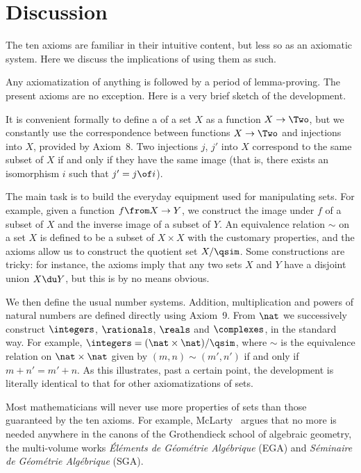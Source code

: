 \documentclass[12pt]{article}
\begin{document}
\section{Discussion} 
\label{sec:rmks}


The ten axioms are familiar in their intuitive content, but less so
as an axiomatic system.  Here we discuss the implications of using them as
such. 


Any axiomatization of anything is followed by a period of lemma-proving.
The present axioms are no exception.  Here is a very brief sketch of the
development.

It is convenient formally to define a  of a set $X$ as a
function $X \to \Two$, but we constantly use the correspondence between
functions $X \to \Two$ and injections into $X$, provided by Axiom~8.  Two
injections $j$, $j'$ into $X$ correspond to the same subset of $X$ if and
only if they have the same image (that is, there exists an isomorphism $i$
such that $j' = j \of i$).

The main task is to build the everyday equipment used for manipulating
sets.  For example, given a function $f\from X \to Y$, we construct the
image under $f$ of a subset of $X$ and the inverse image of a subset of
$Y$.  An equivalence relation $\sim$ on a set $X$ is defined to be a subset
of $X \times X$ with the customary properties, and the axioms allow us to
construct the quotient set $X/\qsim$.  Some constructions are tricky: for
instance, the axioms imply that any two sets $X$ and $Y$ have a disjoint
union $X \du Y$, but this is by no means obvious.

We then define the usual number systems.  Addition, multiplication and
powers of natural numbers are defined directly using Axiom~9.  From $\nat$
we successively construct $\integers$, $\rationals$, $\reals$ and
$\complexes$, in the standard way.  For example, $\integers = (\nat \times
\nat)/\qsim$, where $\sim$ is the equivalence relation on $\nat \times
\nat$ given by $(m, n) \sim (m', n')$ if and only if $m + n' = m' + n$.  As
this illustrates, past a certain point, the development is literally
identical to that for other axiomatizations of sets.



Most mathematicians will never use more properties of sets than those
guaranteed by the ten axioms.  For example, McLarty~\cite{McLaFOA} argues
that no more is needed anywhere in the canons of the Grothendieck school of
algebraic geometry, the multi-volume works \emph{\'El\'ements de
G\'eom\'etrie Alg\'ebrique} (EGA) and \emph{S\'eminaire de G\'eom\'etrie
Alg\'ebrique} (SGA).
\end{document}
